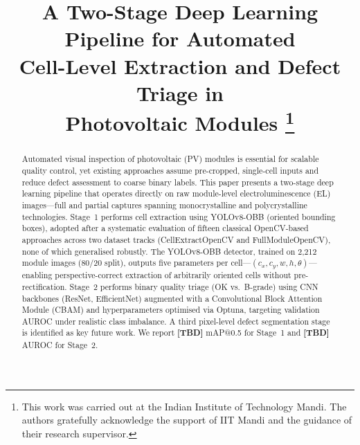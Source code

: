 \documentclass[conference]{IEEEtran}
\begin{document}
\title{A Two-Stage Deep Learning Pipeline for Automated\\
Cell-Level Extraction and Defect Triage in\\
Photovoltaic Modules%
\thanks{This work was carried out at the Indian Institute of
Technology Mandi. The authors gratefully acknowledge the
support of IIT Mandi and the guidance of their research
supervisor.}
}

\author{%
\and
{}
}

\maketitle

\begin{abstract}
Automated visual inspection of photovoltaic (PV) modules is
essential for scalable quality control, yet existing approaches
assume pre-cropped, single-cell inputs and reduce defect
assessment to coarse binary labels.
This paper presents a two-stage deep learning pipeline that
operates directly on raw module-level electroluminescence (EL)
images---full and partial captures spanning monocrystalline and
polycrystalline technologies.
Stage~1 performs cell extraction using YOLOv8-OBB (oriented
bounding boxes), adopted after a systematic evaluation of
fifteen classical OpenCV-based approaches across two dataset
tracks (CellExtractOpenCV and FullModuleOpenCV),
none of which generalised robustly.
The YOLOv8-OBB detector, trained on 2{,}212 module images
(80/20 split), outputs five parameters per cell---$(c_x, c_y, w,
h, \theta)$---enabling perspective-correct extraction of
arbitrarily oriented cells without pre-rectification.
Stage~2 performs binary quality triage (OK vs.\ B-grade)
using CNN backbones (ResNet, EfficientNet) augmented with a
Convolutional Block Attention Module (CBAM) and
hyperparameters optimised via Optuna, targeting validation
AUROC under realistic class imbalance.
A third pixel-level defect segmentation stage is identified
as key future work.
We report \textbf{[TBD]} mAP@0.5 for Stage~1 and
\textbf{[TBD]} AUROC for Stage~2.
\end{abstract}
\end{document}
